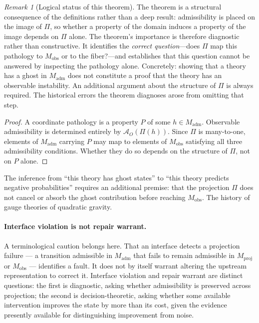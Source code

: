 \documentclass[12pt,a4paper]{article}
\theoremstyle{remark}
\newtheorem{remark}{Remark}[section]
\begin{document}
\begin{remark}[Logical status of this theorem]
The theorem is a structural consequence of the definitions rather than a
deep result: admissibility is placed on the image of $\Pi$, so whether a
property of the domain induces a property of the image depends on $\Pi$
alone. The theorem's importance is therefore diagnostic rather than
constructive. It identifies the \emph{correct question}---does $\Pi$ map
this pathology to $M_{\mathrm{obs}}$ or to the fiber?---and establishes
that this question cannot be answered by inspecting the pathology alone.
Concretely: showing that a theory has a ghost in $M_{\mathrm{adm}}$ does
not constitute a proof that the theory has an observable instability.
An additional argument about the structure of $\Pi$ is always required.
The historical errors the theorem diagnoses arose from omitting that step.
\end{remark}

\begin{proof}
A coordinate pathology is a property $P$ of some $h \in M_{\mathrm{adm}}$.
Observable admissibility is determined entirely by $\mathcal{A}_O(\Pi(h))$.
Since $\Pi$ is many-to-one, elements of $M_{\mathrm{adm}}$ carrying $P$
may map to elements of $M_{\mathrm{obs}}$ satisfying all three admissibility
conditions. Whether they do so depends on the structure of $\Pi$, not on
$P$ alone.
\end{proof}

The inference from ``this theory has ghost states'' to ``this theory
predicts negative probabilities'' requires an additional premise: that
the projection $\Pi$ does not cancel or absorb the ghost contribution
before reaching $M_{\mathrm{obs}}$. The history of gauge theories
of quadratic gravity.

\paragraph{Interface violation is not repair warrant.}
A terminological caution belongs here. That an interface detects a
projection failure --- a transition admissible in $M_{\mathrm{adm}}$
that fails to remain admissible in $M_{\mathrm{proj}}$ or
$M_{\mathrm{obs}}$ --- identifies a fault. It does not by itself warrant
altering the upstream representation to correct it. Interface violation
and repair warrant are distinct questions: the first is diagnostic,
asking whether admissibility is preserved across projection; the second
is decision-theoretic, asking whether some available intervention
improves the state by more than its cost, given the evidence presently
available for distinguishing improvement from noise.
\end{document}
